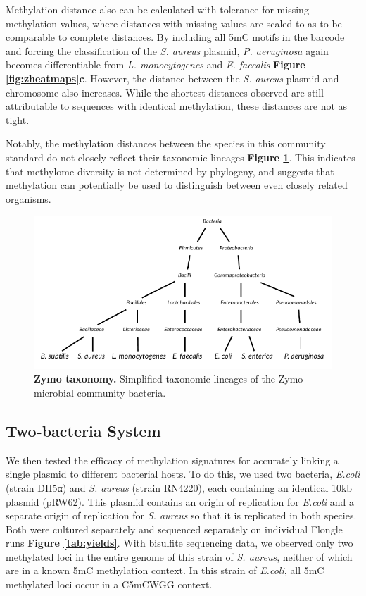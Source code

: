 Methylation distance also can be calculated with tolerance for missing methylation values, where distances with missing values are scaled to as to be comparable to complete distances. By including all 5mC motifs in the barcode and forcing the classification of the \textit{S. aureus} plasmid, \textit{P. aeruginosa} again becomes differentiable from \textit{L. monocytogenes} and \textit{E. faecalis} {\bf Figure \ref{fig:zheatmaps}c}. However, the distance between the \textit{S. aureus} plasmid and chromosome also increases. While the shortest distances observed are still attributable to sequences with identical methylation, these distances are not as tight.

Notably, the methylation distances between the species in this community standard do not closely reflect their taxonomic lineages {\bf Figure \ref{fig:taxonomy}}. This indicates that methylome diversity is not determined by phylogeny, and suggests that methylation can potentially be used to distinguish between even closely related organisms.

\begin{figure}[!hb]
\centering
\includegraphics[width = 1\linewidth,keepaspectratio]{figure/taxonomy.pdf}
\caption[Zymo taxonomy]{{\bf Zymo taxonomy.} Simplified taxonomic lineages of the Zymo microbial community bacteria. }
\label{fig:taxonomy}
\end{figure}


\subsection{Two-bacteria System}
\label{sec:byard}

We then tested the efficacy of methylation signatures for accurately linking a single plasmid to different bacterial hosts. To do this, we used two bacteria, \textit{E.coli} (strain DH5α) and \textit{S. aureus} (strain RN4220), each containing an identical 10kb plasmid (pRW62). This plasmid contains an origin of replication for \textit{E.coli} and a separate origin of replication for \textit{S. aureus} so that it is replicated in both species. Both were cultured separately and sequenced separately on individual Flongle runs {\bf Figure \ref{tab:yields}}. With bisulfite sequencing data, we observed only two methylated loci in the entire genome of this strain of \textit{S. aureus}, neither of which are in a known 5mC methylation context. In this strain of \textit{E.coli}, all 5mC methylated loci occur in a C5mCWGG context.


